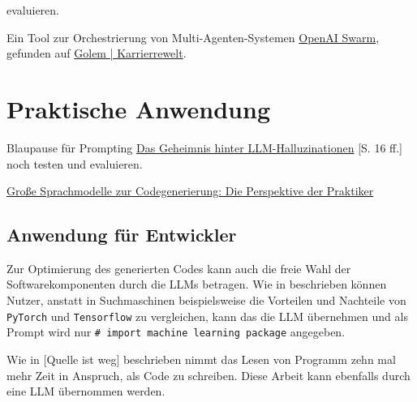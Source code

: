 evaluieren.


\begin{tcolorbox}[
	enhanced,
	breakable,
	colback=red!5!white,
	colframe=red!75!black!50,
	title= Mein roter Faden: noch was zum Testen
	]
	Ein Tool zur Orchestrierung von Multi-Agenten-Systemen \href{https://community.openai.com/t/introducing-swarm-js-node-js-implementation-of-openai-swarm/977510}{OpenAI Swarm}, gefunden auf \href{https://karrierewelt.golem.de/blogs/karriere-ratgeber/bot-belegschaft-mit-entlastungspotenzial-ki-agenten-fur-den-arbeitsalltag-in-der-testphase-1}{Golem | Karrierrewelt}.
\end{tcolorbox}

\section{Praktische Anwendung}
Blaupause für Prompting \href{https://piamedia.com/wp-content/uploads/2024/09/PIAM_Whitepaper_LLM-Halluzinationen_DE.pdf}{Das Geheimnis hinter LLM-Halluzinationen} [S. 16 ff.] noch testen und evaluieren.

\href{https://arxiv.org/html/2501.16998v1}{Große Sprachmodelle zur Codegenerierung: Die Perspektive der Praktiker}

\subsection{Anwendung für Entwickler}
Zur Optimierung des generierten Codes kann auch die freie Wahl der Softwarekomponenten durch die LLMs betragen. Wie in \cite{chen-2021} beschrieben können Nutzer, anstatt in Suchmaschinen beispielsweise die Vorteilen und Nachteile von \texttt{PyTorch} und \texttt{Tensorflow} zu vergleichen, kann das die LLM übernehmen und als Prompt wird nur \texttt{\# import machine learning package} angegeben.\vspace{0.2cm}

Wie in [Quelle ist weg] beschrieben nimmt das Lesen von Programm zehn mal mehr Zeit in Anspruch, als Code zu schreiben. Diese Arbeit kann ebenfalls durch eine LLM übernommen werden.
